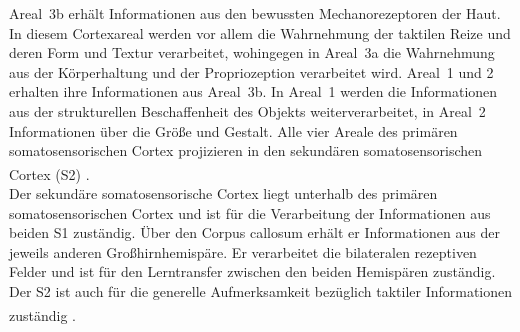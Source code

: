 \documentclass[12pt,a4paper,pdftex]{article}
\begin{document}
\newpage
Areal~3b erhält Informationen aus den bewussten Mechanorezeptoren der Haut. In diesem Cortexareal werden vor allem die Wahrnehmung der taktilen Reize und deren Form und Textur verarbeitet, wohingegen in Areal~3a die Wahrnehmung aus der Körperhaltung und der Propriozeption verarbeitet wird. Areal~1 und 2 erhalten ihre Informationen aus Areal~3b. In Areal~1 werden die Informationen aus der strukturellen Beschaffenheit des Objekts weiterverarbeitet, in Areal~2 Informationen über die Größe und Gestalt. Alle vier Areale des primären somatosensorischen Cortex projizieren in den sekundären somatosensorischen Cortex (S2) \textsuperscript{\cite[12]{neurowissenschaften_baer}}.
\\
\noindent Der sekundäre somatosensorische Cortex  liegt unterhalb des primären somatosensorischen Cortex und ist für die Verarbeitung der Informationen aus beiden S1 zuständig. Über den Corpus callosum erhält er Informationen aus der jeweils anderen Großhirnhemispäre. Er verarbeitet die bilateralen rezeptiven Felder und ist für den Lerntransfer zwischen den beiden Hemispären zuständig. Der S2 ist auch für die generelle Aufmerksamkeit bezüglich taktiler Informationen zuständig \textsuperscript{\cite[12]{neurowissenschaften_baer}}.
\end{document}

